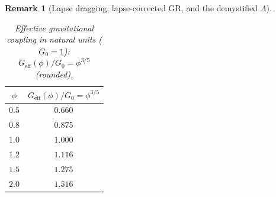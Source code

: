 \documentclass[11pt]{amsart}
\newtheorem{remark}[theorem]{Remark}
\begin{document}
\begin{remark}[\texorpdfstring{Lapse dragging, lapse-corrected GR, and the demystified $\Lambda$}{Lapse dragging, lapse-corrected GR, and demystified Lambda}]
\begin{table}[ht]
\centering
\small
\caption{Effective gravitational coupling in natural units (\(G_0=1\)): \(G_{\mathrm{eff}}(\phi)/G_0=\phi^{3/5}\) (rounded).}
\label{tab:Geff-numerics}
\begin{tabular}{@{}c@{\quad}c@{}}
\hline
\(\phi\) & \(G_{\mathrm{eff}}(\phi)/G_0=\phi^{3/5}\) \\
\hline
\(0.5\) & \(0.660\) \\
\(0.8\) & \(0.875\) \\
\(1.0\) & \(1.000\) \\
\(1.2\) & \(1.116\) \\
\(1.5\) & \(1.275\) \\
\(2.0\) & \(1.516\) \\
\hline
\end{tabular}
\end{table}


\end{remark}
\end{document}
